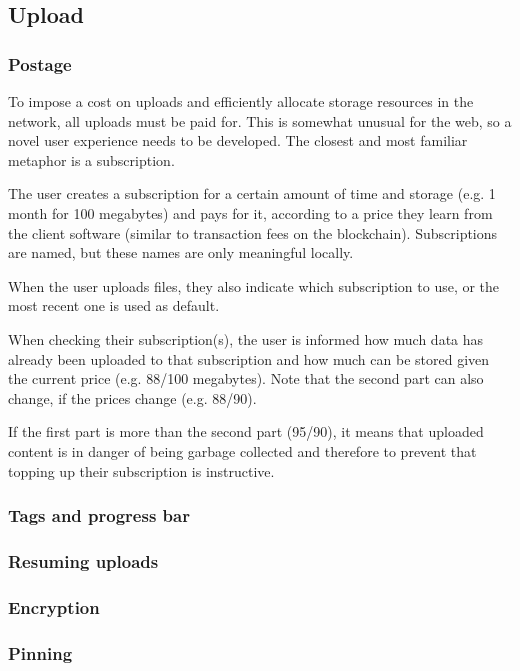\subsection{Upload}\label{sec:upload}


\subsubsection{Postage}

To impose a cost on uploads and efficiently allocate storage resources in the network, all uploads must be paid for.  This is somewhat unusual for the web, so a novel user experience needs to be developed. The closest and most familiar metaphor is a subscription.

The user creates a subscription for a certain amount of time and storage (e.g. 1 month for 100 megabytes) and pays for it, according to a price they learn from the client software (similar to transaction fees on the blockchain). Subscriptions are named, but these names are only meaningful locally.

When the user uploads files, they also indicate which subscription to use, or the most recent one is used as default.

When checking their subscription(s), the user is informed how much data has already been uploaded to that subscription and how much can be stored given the current price (e.g. 88/100 megabytes). Note that the second part can also change, if the prices change (e.g. 88/90).

If the first part is more than the second part (95/90), it means that uploaded content is in danger of being garbage collected and therefore to prevent that topping up their subscription is instructive.

\subsubsection{Tags and progress bar}

\subsubsection{Resuming uploads}
\subsubsection{Encryption}
\subsubsection{Pinning}
